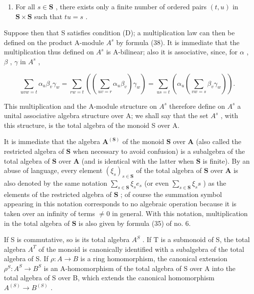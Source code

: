 \begin{enumerate}
\def\labelenumi{(\Alph{enumi})}
\setcounter{enumi}{3}
\tightlist
\item
  For all \(s \in \mathbf{S}\) , there exists only a finite number of ordered pairs \((t, u)\) in \(\mathbf{S} \times \mathbf{S}\) such that \(tu = s\) .
\end{enumerate}

Suppose then that S satisfies condition (D); a multiplication law can then be defined on the product A-module \(A^{s}\) by formula (38). It is immediate that the multiplication thus defined on \(A^{s}\) is A-bilinear; also it is associative, since, for \(\alpha\) , \(\beta\) , \(\gamma\) in \(A^{s}\) ,

\[
\sum_ {u v w = t} \alpha_ {u} \beta_ {v} \gamma_ {w} = \sum_ {r w = t} \left(\left(\sum_ {u v = r} \alpha_ {u} \beta_ {v}\right) \gamma_ {w}\right) = \sum_ {u s = t} \left(\alpha_ {u} \left(\sum_ {v w = s} \beta_ {v} \gamma_ {w}\right)\right).
\]

This multiplication and the A-module structure on \(A^{s}\) therefore define on \(A^{s}\) a unital associative algebra structure over A; we shall say that the set \(A^{s}\) , with this structure, is the total algebra of the monoid S over A.

It is immediate that the algebra \(\mathbf{A}^{(\mathbf{S})}\) of the monoid \(\mathbf{S}\) over \(\mathbf{A}\) (also called the restricted algebra of \(\mathbf{S}\) when necessary to avoid confusion) is a subalgebra of the total algebra of \(\mathbf{S}\) over \(\mathbf{A}\) (and is identical with the latter when \(\mathbf{S}\) is finite). By an abuse of language, every element \((\xi_s)_{s \in \mathbf{S}}\) of the total algebra of \(\mathbf{S}\) over \(\mathbf{A}\) is also denoted by the same notation \(\sum_{s \in \mathbf{S}} \xi_s e_s\) (or even \(\sum_{s \in \mathbf{S}} \xi_s s\) ) as the elements of the restricted algebra of \(\mathbf{S}\) ; of course the summation symbol appearing in this notation corresponds to no algebraic operation because it is taken over an infinity of terms \(\neq 0\) in general. With this notation, multiplication in the total algebra of \(\mathbf{S}\) is also given by formula (35) of no. 6.

If S is commutative, so is its total algebra \(A^{S}\) . If T is a submonoid of S, the total algebra \(A^{T}\) of the monoid is canonically identified with a subalgebra of the total algebra of S. If \(\rho: A \to B\) is a ring homomorphism, the canonical extension \(\rho^{S}: A^{S} \to B^{S}\) is an A-homomorphism of the total algebra of S over A into the total algebra of S over B, which extends the canonical homomorphism \(A^{(S)} \to B^{(S)}\) .
